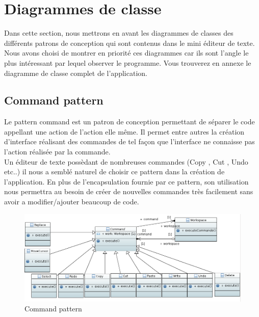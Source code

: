 \documentclass[11pt,a4paper,oldfontcommands]{memoir}
\begin{document}
\section{Diagrammes de classe}
Dans cette section, nous mettrons en avant les diagrammes de classes des différents patrons de conception qui sont contenus dans le mini éditeur de texte.
Nous avons choisi de montrer en priorité ces diagrammes car ils sont l'angle le plus intéressant par lequel observer le programme. Vous trouverez en annexe le diagramme de classe complet de l'application.
\subsection{Command pattern}
Le pattern command est un patron de conception permettant de séparer le code appellant une action de l'action elle même. Il permet entre autres la création d'interface réalisant des commandes de tel façon que l'interface ne connaisse pas l'action réalisée par la commande. \\
Un éditeur de texte possèdant de nombreuses commandes (Copy , Cut , Undo etc..) il nous a semblé naturel de choisir ce pattern dans la création de l'application. En plus de l'encapsulation fournie par ce pattern, son utilisation nous permettra au besoin de créer de nouvelles commandes très facilement sans avoir a modifier/ajouter beaucoup de code.
\begin{figure}[!ht]
\centering 
\includegraphics[width=13cm]{CommandPattern.png}
\caption{Command pattern}
\label{figure2}
\end{figure}
\end{document}
